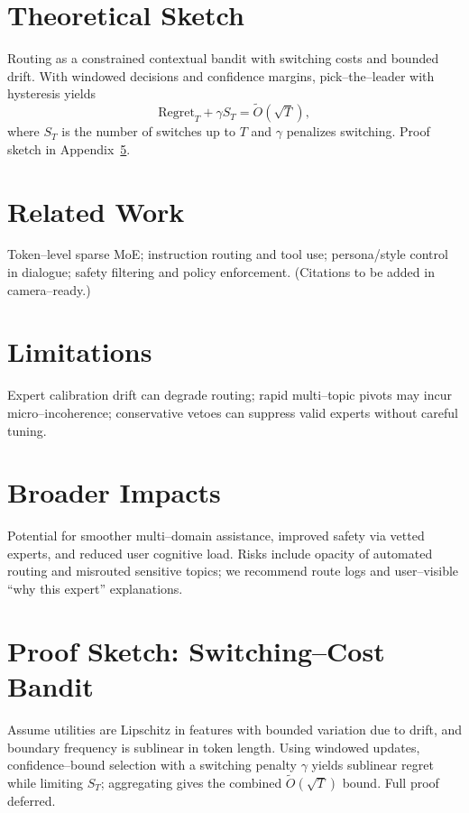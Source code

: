 \documentclass[11pt]{article}
\begin{document}
\section{Theoretical Sketch}
Routing as a constrained contextual bandit with switching costs and bounded drift. With windowed decisions and confidence margins, pick--the--leader with hysteresis yields
\begin{equation}
\mathrm{Regret}_T + \gamma S_T = \tilde{O}\!\left(\sqrt{T}\right),
\end{equation}
where $S_T$ is the number of switches up to $T$ and $\gamma$ penalizes switching. Proof sketch in Appendix~\ref{app:proof}.

\section{Related Work}
Token--level sparse MoE; instruction routing and tool use; persona/style control in dialogue; safety filtering and policy enforcement. (Citations to be added in camera--ready.)

\section{Limitations}
Expert calibration drift can degrade routing; rapid multi--topic pivots may incur micro--incoherence; conservative vetoes can suppress valid experts without careful tuning.

\section{Broader Impacts}
Potential for smoother multi--domain assistance, improved safety via vetted experts, and reduced user cognitive load. Risks include opacity of automated routing and misrouted sensitive topics; we recommend route logs and user--visible ``why this expert'' explanations.

\appendix

\section{Proof Sketch: Switching--Cost Bandit}
\label{app:proof}
Assume utilities are Lipschitz in features with bounded variation due to drift, and boundary frequency is sublinear in token length. Using windowed updates, confidence--bound selection with a switching penalty $\gamma$ yields sublinear regret while limiting $S_T$; aggregating gives the combined $\tilde{O}(\sqrt{T})$ bound. Full proof deferred.
\end{document}
